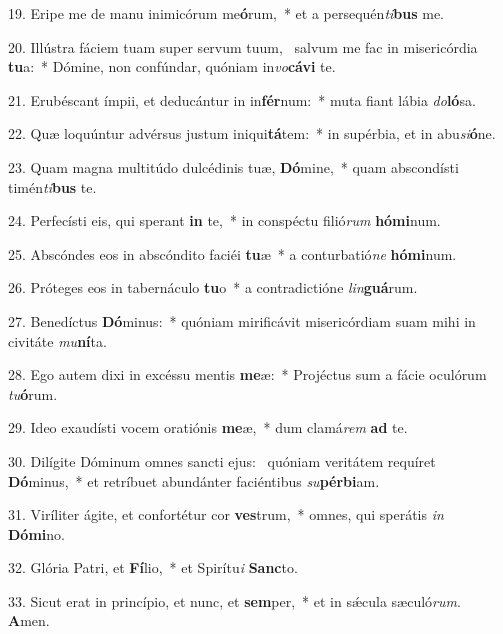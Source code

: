 19. Eripe me de manu inimicórum me\textbf{ó}rum,~*  et a persequén\textit{ti}\textbf{bus} me.\

20. Illústra fáciem tuam super servum tuum, \dag\  salvum me fac in misericórdia \textbf{tu}a:~*  Dómine, non confúndar, quóniam in\textit{vo}\textbf{cá}\textbf{vi} te.\

21. Erubéscant ímpii, et deducántur in in\textbf{fér}num:~*  muta fiant lábia \textit{do}\textbf{ló}sa.\

22. Quæ loquúntur advérsus justum iniqui\textbf{tá}tem:~*  in supérbia, et in abu\textit{si}\textbf{ó}ne.\

23. Quam magna multitúdo dulcédinis tuæ, \textbf{Dó}mine,~*  quam abscondísti timén\textit{ti}\textbf{bus} te.\

24. Perfecísti eis, qui sperant \textbf{in} te,~*  in conspéctu filió\textit{rum} \textbf{hó}\textbf{mi}num.\

25. Abscóndes eos in abscóndito faciéi \textbf{tu}æ~*  a conturbatió\textit{ne} \textbf{hó}\textbf{mi}num.\

26. Próteges eos in tabernáculo \textbf{tu}o~*  a contradictióne \textit{lin}\textbf{guá}rum.\

27. Benedíctus \textbf{Dó}minus:~*  quóniam mirificávit misericórdiam suam mihi in civitáte \textit{mu}\textbf{ní}ta.\

28. Ego autem dixi in excéssu mentis \textbf{me}æ:~*  Projéctus sum a fácie oculórum \textit{tu}\textbf{ó}rum.\

29. Ideo exaudísti vocem oratiónis \textbf{me}æ,~*  dum clamá\textit{rem} \textbf{ad} te.\

30. Dilígite Dóminum omnes sancti ejus: \dag\  quóniam veritátem requíret \textbf{Dó}minus,~*  et retríbuet abundánter faciéntibus \textit{su}\textbf{pér}\textbf{bi}am.\

31. Viríliter ágite, et confortétur cor \textbf{ves}trum,~*  omnes, qui sperátis \textit{in} \textbf{Dó}\textbf{mi}no.\

32. Glória Patri, et \textbf{Fí}lio,~*  et Spirítu\textit{i} \textbf{Sanc}to.\

33. Sicut erat in princípio, et nunc, et \textbf{sem}per,~*  et in sǽcula sæculó\textit{rum}. \textbf{A}men.\

